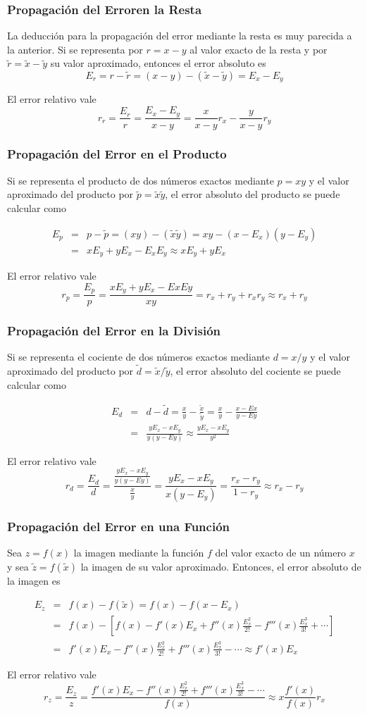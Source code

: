 \documentclass{beamer}
\begin{document}
\frame
{
\frametitle{Propagaci\'on del Erroren la Resta}

La deducci\'on para la propagaci\'on del error mediante la resta es muy parecida a la anterior. Si se representa por $r = x - y$ al valor exacto de la resta y por $\tilde r =\tilde x -\tilde y$ su valor aproximado, entonces el error absoluto es
$$
E_r = r -\tilde r = (x - y) - (\tilde x - \tilde y) = E_x - E_y
$$

El error relativo vale
$$
r_r = \frac{E_r}{r} = \frac{E_x-E_y}{x-y} = \frac{x}{x-y}r_x - \frac{y}{x-y}r_y
$$
}
\frame
{
\frametitle{Propagaci\'on del Error en el Producto}
Si se representa el producto de dos n\'umeros exactos mediante $p = xy$ y el valor aproximado del producto por $\tilde p = \tilde x\tilde y$, el error absoluto del producto se puede calcular como

\begin{eqnarray}
\nonumber E_p &=& p -\tilde p = (xy) - (\tilde x \tilde y) = xy - (x-E_x) (y- E_y)\\
\nonumber &=& x E_y + y E_x - E_x E_y \approx xE_y + yE_x
\end{eqnarray}


El error relativo vale
$$
r_p = \frac{E_p}{p} = \frac{xE_y+yE_x-ExEy}{xy} = r_x+r_y+r_xr_y \approx r_x+r_y
$$
}
\frame
{
\frametitle{Propagaci\'on del Error en la Divisi\'on}

Si se representa el cociente de dos n\'umeros exactos mediante $d = x/y$ y el valor aproximado del producto por $\tilde d = \tilde x/\tilde y$, el error absoluto del cociente se puede calcular como

\begin{eqnarray}
\nonumber E_d &=& d -\tilde d = \frac{x}{y} - \frac{\tilde x}{\tilde y} =\frac{x}{y} - \frac{x-Ex}{y-Ey}\\
\nonumber &=& \frac{yE_x-xE_y}{y(y-Ey)} \approx \frac{yE_x-xE_y}{y^2}
\end{eqnarray}


El error relativo vale
$$
r_d = \frac{E_d}{d} = \frac{\frac{yE_x-xE_y}{y(y-Ey)}}{\frac{x}{y}} = \frac{yE_x-xE_y}{x(y-E_y)} =  \frac{r_x-r_y}{1-r_y} \approx r_x-r_y
$$
}
\frame
{
\frametitle{Propagaci\'on del Error en una Funci\'on}

Sea $z = f(x)$ la imagen mediante la funci\'on $f$ del valor exacto de un n\'umero $x$ y sea $\tilde z = f(\tilde x)$ la imagen de su valor aproximado. Entonces, el error absoluto de la imagen es

\begin{eqnarray}
\nonumber E_z &=& f(x) -f(\tilde x) = f(x) - f(x-E_x)\\
\nonumber &=& f(x) - \left[f(x)-f'(x)E_x+f''(x)\frac{E_x^2}{2!}-f'''(x)\frac{E_x^3}{3!}+\cdots\right]\\
\nonumber &=& f'(x)E_x-f''(x)\frac{E_x^2}{2!}+f'''(x)\frac{E_x^3}{3!}-\cdots \approx f'(x)E_x
\end{eqnarray}


El error relativo vale
$$
r_z = \frac{E_z}{z} = \frac{f'(x)E_x-f''(x)\frac{E_x^2}{2!}+f'''(x)\frac{E_x^3}{3!}-\cdots}{f(x)}  \approx  x\frac{f'(x)}{f(x)}r_x 
$$
}
\end{document}
